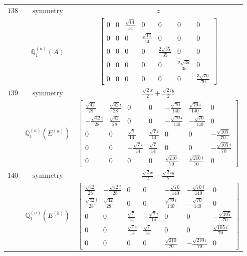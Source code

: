 \documentclass[fleqn,8pt,landscape]{jsarticle}
\begin{document}
\begin{longtable}{ccc}
$ 138 $ & $ \text{symmetry} $ & $ z $ \\
$  $ & $ \mathbb{Q}_{1}^{(a)}(A) $ & $ \begin{bmatrix} 0 & 0 & \frac{\sqrt{14}}{14} & 0 & 0 & 0 & 0 \\ 0 & 0 & 0 & \frac{\sqrt{14}}{14} & 0 & 0 & 0 \\ 0 & 0 & 0 & 0 & \frac{2 \sqrt{35}}{35} & 0 & 0 \\ 0 & 0 & 0 & 0 & 0 & \frac{2 \sqrt{35}}{35} & 0 \\ 0 & 0 & 0 & 0 & 0 & 0 & \frac{3 \sqrt{70}}{70} \end{bmatrix} $ \\ \hline
$ 139 $ & $ \text{symmetry} $ & $ \frac{\sqrt{2} x}{2} + \frac{\sqrt{2} i y}{2} $ \\
$  $ & $ \mathbb{Q}_{1}^{(a)}(E^{(a)}) $ & $ \begin{bmatrix} \frac{\sqrt{42}}{28} & \frac{\sqrt{42} i}{28} & 0 & 0 & - \frac{\sqrt{70}}{140} & \frac{\sqrt{70} i}{140} & 0 \\ - \frac{\sqrt{42} i}{28} & \frac{\sqrt{42}}{28} & 0 & 0 & - \frac{\sqrt{70} i}{140} & - \frac{\sqrt{70}}{140} & 0 \\ 0 & 0 & \frac{\sqrt{7}}{14} & \frac{\sqrt{7} i}{14} & 0 & 0 & - \frac{\sqrt{105}}{70} \\ 0 & 0 & - \frac{\sqrt{7} i}{14} & \frac{\sqrt{7}}{14} & 0 & 0 & - \frac{\sqrt{105} i}{70} \\ 0 & 0 & 0 & 0 & \frac{\sqrt{210}}{70} & \frac{\sqrt{210} i}{70} & 0 \end{bmatrix} $ \\ \hline
$ 140 $ & $ \text{symmetry} $ & $ \frac{\sqrt{2} x}{2} - \frac{\sqrt{2} i y}{2} $ \\
$  $ & $ \mathbb{Q}_{1}^{(a)}(E^{(b)}) $ & $ \begin{bmatrix} \frac{\sqrt{42}}{28} & - \frac{\sqrt{42} i}{28} & 0 & 0 & - \frac{\sqrt{70}}{140} & - \frac{\sqrt{70} i}{140} & 0 \\ \frac{\sqrt{42} i}{28} & \frac{\sqrt{42}}{28} & 0 & 0 & \frac{\sqrt{70} i}{140} & - \frac{\sqrt{70}}{140} & 0 \\ 0 & 0 & \frac{\sqrt{7}}{14} & - \frac{\sqrt{7} i}{14} & 0 & 0 & - \frac{\sqrt{105}}{70} \\ 0 & 0 & \frac{\sqrt{7} i}{14} & \frac{\sqrt{7}}{14} & 0 & 0 & \frac{\sqrt{105} i}{70} \\ 0 & 0 & 0 & 0 & \frac{\sqrt{210}}{70} & - \frac{\sqrt{210} i}{70} & 0 \end{bmatrix} $ \\ \hline

\end{longtable}
\end{document}
